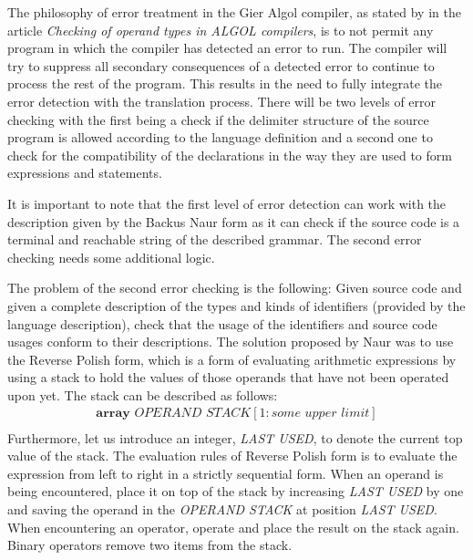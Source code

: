 \documentclass{article}
\begin{document}
The philosophy of error treatment in the Gier Algol compiler, as stated by \cite{naur1965checking} in the article \textit{Checking of operand types in ALGOL compilers}, is to not permit any program in which the compiler has detected an error to run. The compiler will try to suppress all secondary consequences of a detected error to continue to process the rest of the program. This results in the need to fully integrate the error detection with the translation process. There will be two levels of error checking with the first being a check if the delimiter structure of the source program is allowed according to the language definition and a second one to check for the compatibility of the declarations in the way they are used to form expressions and statements.

It is important to note that the first level of error detection can work with the description given by the Backus Naur form as it can check if the source code is a terminal and reachable string of the described grammar. The second error checking needs some additional logic. 

The problem of the second error checking is the following: Given source code and given a complete description of the types and kinds of identifiers (provided by the language description), check that the usage of the identifiers and source code usages conform to their descriptions.
\newpage
The solution proposed by Naur was to use the Reverse Polish form, which is a form of evaluating arithmetic expressions by using a stack to hold the values of those operands that have not been operated upon yet. The stack can be described as follows:
\\
\begin{equation} \label{eq6}
	\begin{split}
		\textbf{array} \textit{ OPERAND STACK}[1:\textit{some upper limit}]\\
	\end{split}
\end{equation}
Furthermore, let us introduce an integer, \textit{LAST USED}, to denote the current top value of the stack. The evaluation rules of Reverse Polish form is to evaluate the expression from left to right in a strictly sequential form. When an operand is being encountered, place it on top of the stack by increasing \textit{LAST USED} by one and saving the operand in the \textit{OPERAND STACK} at position \textit{LAST USED}. When encountering an operator, operate and place the result on the stack again. Binary operators remove two items from the stack.
\end{document}
